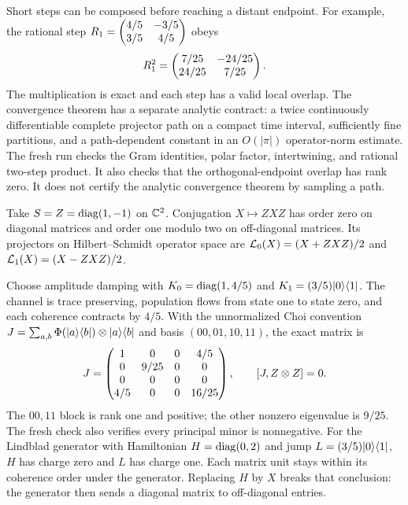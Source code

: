 Short steps can be composed before reaching a distant endpoint. For example, the rational step $R_1=\begin{pmatrix}4/5&-3/5\\3/5&4/5\end{pmatrix}$ obeys
\[
R_1^2=\begin{pmatrix}7/25&-24/25\\24/25&7/25\end{pmatrix}.
\]
The multiplication is exact and each step has a valid local overlap. The convergence theorem has a separate analytic contract: a twice continuously differentiable complete projector path on a compact time interval, sufficiently fine partitions, and a path-dependent constant in an $O(|\pi|)$ operator-norm estimate.
The fresh run checks the Gram identities, polar factor, intertwining, and rational two-step product. It also checks that the orthogonal-endpoint overlap has rank zero. It does not certify the analytic convergence theorem by sampling a path.

Take $S=Z=\operatorname{diag}(1,-1)$ on $\CC^2$. Conjugation $X\mapsto ZXZ$ has order zero on diagonal matrices and order one modulo two on off-diagonal matrices. Its projectors on Hilbert--Schmidt operator space are $\Lcal_0(X)=(X+ZXZ)/2$ and $\Lcal_1(X)=(X-ZXZ)/2$.

Choose amplitude damping with $K_0=\operatorname{diag}(1,4/5)$ and $K_1=(3/5)\lvert 0\rangle\langle 1\rvert$. The channel is trace preserving, population flows from state one to state zero, and each coherence contracts by $4/5$.
With the unnormalized Choi convention $J=\sum_{a,b}\Phi(\lvert a\rangle\langle b\rvert)\otimes\lvert a\rangle\langle b\rvert$ and basis $(00,01,10,11)$, the exact matrix is
\[
J=\begin{pmatrix}1&0&0&4/5\\0&9/25&0&0\\0&0&0&0\\4/5&0&0&16/25\end{pmatrix},
\qquad [J,Z\otimes Z]=0.
\]
The $00,11$ block is rank one and positive; the other nonzero eigenvalue is $9/25$. The fresh check also verifies every principal minor is nonnegative.
For the Lindblad generator with Hamiltonian $H=\operatorname{diag}(0,2)$ and jump $L=(3/5)\lvert 0\rangle\langle 1\rvert$, $H$ has charge zero and $L$ has charge one. Each matrix unit stays within its coherence order under the generator. Replacing $H$ by $X$ breaks that conclusion: the generator then sends a diagonal matrix to off-diagonal entries.

